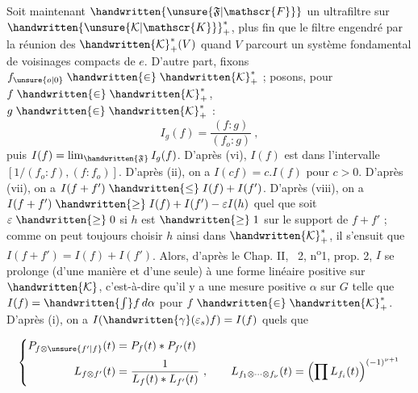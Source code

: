 Soit maintenant $\handwritten{\unsure{\mathfrak{F}|\mathscr{F}}}$ un ultrafiltre sur $\handwritten{\unsure{\mathcal{K}|\mathscr{K}}}^{\ast}_{+}$, plus fin que le filtre engendré par la réunion des $\handwritten{\mathcal{K}}^{\ast}_{+}(V)$ quand $V$ parcourt un système fondamental de voisinages compacts de $e$. D'autre part, fixons $f_{\unsure{o|0}}\mathrel{\handwritten{\in}}\handwritten{\mathcal{K}}^{\ast}_{+}$ ; posons, pour $f\mathrel{\handwritten{\in}}\handwritten{\mathcal{K}}^{\ast}_{+}$, $g\mathrel{\handwritten{\in}}\handwritten{\mathcal{K}}^{\ast}_{+}$ :
\[
I_g(f)=\frac{(f:g)}{(f_o:g)}\ ,
\]
puis $I(f)=\lim_{\handwritten{\mathfrak{F}}}I_g(f)$. D'après (vi), $I(f)$ est dans l'intervalle $[1/(f_o:f),(f:f_o)]$. D'après (ii), on a $I(cf)=c.I(f)$ pour $c>0$. D'après (vii), on a $I(f+f')\mathrel{\handwritten{\leq}}I(f)+I(f')$. D'après (viii), on a $I(f+f')\mathrel{\handwritten{\geq}}I(f)+I(f')-\varepsilon I(h)$ quel que soit $\varepsilon\mathrel{\handwritten{\geq}}0$ si $h$ est $\mathrel{\handwritten{\geq}}1$ sur le support de $f+f'$ ; comme on peut toujours choisir $h$ ainsi dans $\handwritten{\mathcal{K}}^{\ast}_{+}$, il s'ensuit que $I(f+f')=I(f)+I(f')$. Alors, d'après le Chap. II, \handwritten{\S}\ 2, n\textsuperscript{o}1, prop. 2, $I$ se prolonge (d'une manière et d'une seule) à une forme linéaire positive sur $\handwritten{\mathcal{K}}$, c'est-à-dire qu'il y a une mesure positive $\alpha$ sur $G$ telle que $I(f)=\handwritten{\int} f\,d\alpha$ pour $f\mathrel{\handwritten{\in}}\handwritten{\mathcal{K}}^{\ast}_{+}$. D'après (i), on a $I(\handwritten{\gamma}(\varepsilon_s)f)=I(f)$ quels que

\[
\left\{\begin{aligned}
P_{f\otimes\unsure{f'|f}}(t)&=P_f(t)\ast P_{f'}(t)\\
L_{f\otimes f'}(t)&=\frac{1}{L_f(t)\ast L_{f'}(t)}\ ,\qquad
L_{f_1\otimes\cdots\otimes f_\nu}(t)=\left(\prod L_{f_i}(t)\right)^{(-1)^{\nu+1}}
\end{aligned}\right.
\]

